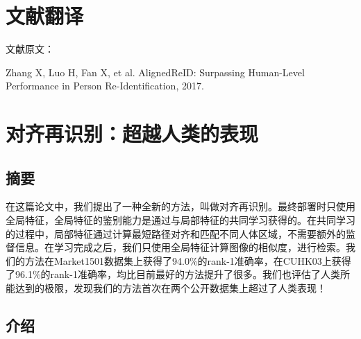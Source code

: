 \chapter{文献翻译}

 {
  \setlength{\parindent}{0em}

  文献原文：

  Zhang X, Luo H, Fan X, et al. AlignedReID: Surpassing Human-Level Performance in Person Re-Identification, 2017. \par

 }

\vspace{2em}

{
	\renewcommand{\cleardoublepage}{}
	\renewcommand{\clearpage}{}
	\titleformat{\chapter}[block]{\sanhao\songti\bfseries\filcenter}{}{0em}{}{}
	\chapter*{对齐再识别：超越人类的表现}
}

\section*{摘要}

在这篇论文中，我们提出了一种全新的方法，叫做对齐再识别。最终部署时只使用全局特征，全局特征的鉴别能力是通过与局部特征的共同学习获得的。在共同学习的过程中，局部特征通过计算最短路径对齐和匹配不同人体区域，不需要额外的监督信息。在学习完成之后，我们只使用全局特征计算图像的相似度，进行检索。我们的方法在Market1501数据集上获得了94.0\%的rank-1准确率，在CUHK03上获得了96.1\%的rank-1准确率，均比目前最好的方法提升了很多。我们也评估了人类所能达到的极限，发现我们的方法首次在两个公开数据集上超过了人类表现！

\section{介绍}

